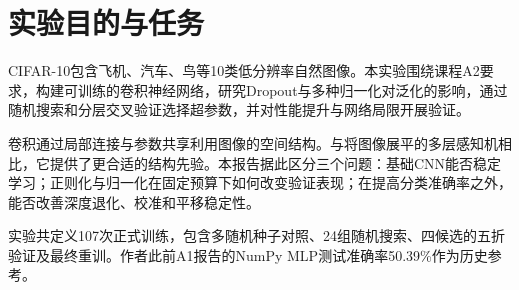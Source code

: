 \section{实验目的与任务}
CIFAR-10包含飞机、汽车、鸟等10类低分辨率自然图像\cite{krizhevskyCifar}。本实验围绕课程A2要求，构建可训练的卷积神经网络，研究Dropout与多种归一化对泛化的影响，通过随机搜索和分层交叉验证选择超参数，并对性能提升与网络局限开展验证。

卷积通过局部连接与参数共享利用图像的空间结构\cite{lecun1998gradient}。与将图像展平的多层感知机相比，它提供了更合适的结构先验。本报告据此区分三个问题：基础CNN能否稳定学习；正则化与归一化在固定预算下如何改变验证表现；在提高分类准确率之外，能否改善深度退化、校准和平移稳定性。

实验共定义107次正式训练，包含多随机种子对照、24组随机搜索、四候选的五折验证及最终重训。作者此前A1报告的NumPy MLP测试准确率50.39\%作为历史参考。
